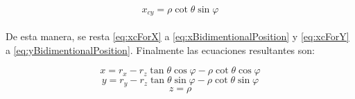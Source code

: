 \documentclass{book}
\begin{document}
\begin{equation}
\label{eq:xcForY}
x_{cy} = \rho \cot{\theta} \sin{\varphi}
\end{equation}\\

De esta manera, se resta \ref{eq:xcForX}  a \ref{eq:xBidimentionalPosition} y \ref{eq:xcForY} a \ref{eq:yBidimentionalPosition}. Finalmente las ecuaciones resultantes son:

\[x = r_x - r_z \tan{\theta} \cos{\varphi} - \rho \cot{\theta} \cos{\varphi}\]
\[y = r_y - r_z \tan{\theta} \sin{\varphi} - \rho \cot{\theta} \sin{\varphi}\]
\[z = \rho \]

%


\end{document}
